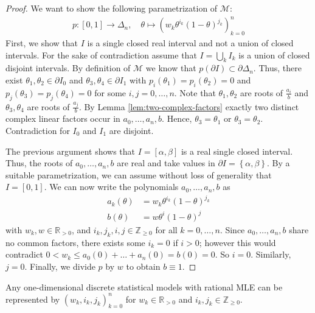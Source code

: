 \begin{proof}
    We want to show the following parametrization of \( \mathcal{M} \):
    \begin{align*}
        p: [0,1] \to \Delta_n, \quad \theta \mapsto (w_k \theta^{i_k} (1-\theta)^{j_k})_{k=0}^n
    \end{align*}
    First, we show that \( I \) is a single closed real interval and not a union of closed intervals. For the sake of contradiction assume that \( I = \bigcup_{k} I_k \) is a union of closed disjoint intervals. By definition of \( \mathcal{M} \) we know that \( p(\partial I) \subset \partial \Delta_n \). Thus, there exist \( \theta_1, \theta_2 \in \partial I_0 \) and \( \theta_3, \theta_4 \in \partial I_1 \) with \( p_i(\theta_1) = p_i(\theta_2) =  0 \) and \( p_j(\theta_3) = p_j(\theta_4) = 0 \) for some \( i,j = 0, \dots, n \). Note that \( \theta_1, \theta_2 \) are roots of \( \frac{a_i}{b} \) and  \( \theta_3, \theta_4 \) are roots of \( \frac{a_j}{b} \). By Lemma \ref{lem:two-complex-factors} exactly two distinct complex linear factors occur in \( a_0, \dots, a_n, b \). Hence, \( \theta_3 = \theta_1 \) or \( \theta_3 = \theta_2 \). Contradiction for \( I_0 \) and \( I_1 \) are disjoint.

    The previous argument shows that \( I = [\alpha, \beta ]\) is a real single closed interval. Thus, the roots of \( a_0, \dots, a_n, b \) are real and take values in \( \partial I = \left\{ \alpha, \beta \right\} \). By a suitable parametrization, we can assume without loss of generality that \( I = [0,1] \). We can now write the polynomials \( a_0, \dots, a_n, b \) as
    \begin{align*}
        a_k(\theta) &= w_k \theta^{i_k} (1-\theta)^{j_k} \\
        b(\theta) &= w \theta^{i} (1-\theta)^{j}
    \end{align*}
    with \( w_k, w \in \mathbb{R}_{>0} \), and \( i_k, j_k, i, j \in \mathbb{Z}_{\geq 0} \) for all \( k = 0, \dots, n \). Since \( a_0, \dots, a_n, b \) share no common factors, there exists some \( i_k = 0 \) if \( i > 0 \); however this would contradict \(0 < w_k \leq a_0(0) + \dots + a_n(0) = b(0) = 0\). So \( i = 0 \). Similarly, \( j = 0 \). Finally, we divide \( p \) by \( w \) to obtain \( b \equiv 1 \).
\end{proof}

\begin{corollary}
    Any one-dimensional {discrete} {statistical} {models} with rational MLE can be represented by \( (w_k, i_k, j_k)_{k=0}^n \) for \( w_k \in \mathbb{R}_{>0} \) and \( i_k, j_k \in \mathbb{Z}_{\geq 0} \).
\end{corollary}

